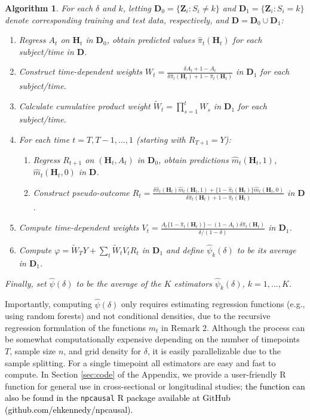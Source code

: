 \documentclass[12pt]{article}
\newcommand{\bZ}{\mathbf{Z}}
\newcommand{\bH}{\mathbf{H}}
\newcommand{\bD}{\mathbf{D}}
\newtheorem{algorithm}{Algorithm}
\theoremstyle{remark}
\begin{document}
\begin{algorithm} For each $\delta$ and $k$, letting $\bD_0=\{\bZ_i : S_i \neq k\}$ and $\bD_1=\{\bZ_i : S_i=k\}$ denote corresponding training and test data, respectively, and $\bD=\bD_0 \cup \bD_1$:
\begin{enumerate} 
\item Regress $A_t$ on $\bH_t$ in $\bD_0$, obtain predicted values $\hat\pi_t(\bH_t)$ for each subject/time in $\bD$.
\item Construct time-dependent weights $W_t = \frac{\delta A_t + 1-A_t}{\delta \hat\pi_t(\bH_t) + 1-\hat\pi_t(\bH_t)}$ in $\bD_1$ for each subject/time.
\item Calculate cumulative product weight $\widetilde{W}_t = \prod_{s=1}^t W_s$ in $\bD_1$ for each subject/time.
\item For each time $t=T, T-1, ..., 1$ (starting with $R_{T+1}=Y$):
\begin{enumerate}
\item Regress $R_{t+1}$ on $(\bH_t,A_t)$ in $\bD_0$, obtain predictions $\hat{m}_t(\bH_t,1)$, $\hat{m}_t(\bH_t,0)$ in $\bD$.
\item Construct pseudo-outcome $R_t=\frac{ \delta \hat\pi_t(\bH_t) \hat{m}_t(\bH_t,1) + \{1- \hat\pi_t(\bH_t)\} \hat{m}_t(\bH_t,0) } { \delta \hat\pi_t(\bH_t) + 1 - \hat\pi_t(\bH_t) }$ in $\bD$.
\end{enumerate}
\item Compute time-dependent weights $V_t = \frac{A_t \{1- \hat\pi_t(\bH_t)\} - (1-A_t) \delta \hat\pi_t(\bH_t) }{ \delta/(1-\delta)}$ in $\bD_1$.
\item Compute $\varphi = \widetilde{W}_T Y + \sum_t \widetilde{W}_t V_t R_t $ in $\bD_1$ and define $\hat\psi_k(\delta)$ to be its average in $\bD_1$.
\end{enumerate}
Finally, set $\hat\psi(\delta)$ to be the average of the $K$ estimators $\hat\psi_k(\delta)$, $k=1,...,K$.
\end{algorithm}

Importantly, computing $\hat\psi(\delta)$ only requires estimating regression functions (e.g., using random forests) and not conditional densities, due to the recursive regression formulation of the functions $m_t$ in Remark 2. Although the process can be somewhat computationally expensive depending on the number of timepoints $T$, sample size $n$, and grid density for $\delta$, it is easily parallelizable due to the sample splitting. For a single timepoint all estimators are easy and fast to compute. In Section \ref{sec:code} of the Appendix, we provide a user-friendly R function for general use in cross-sectional or longitudinal studies; \textcolor{black}{the function can also be found in the} \verb|npcausal| \textcolor{black}{R package available at GitHub (github.com/ehkennedy/npcausal).}
\end{document}
